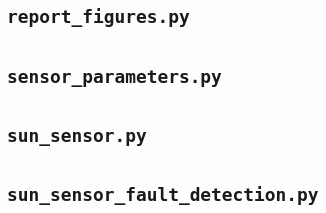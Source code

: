 \documentclass[11pt,a4paper]{article}
\begin{document}
\subsection{\texttt{report\_figures.py}}


\subsection{\texttt{sensor\_parameters.py}}


\subsection{\texttt{sun\_sensor.py}}


\subsection{\texttt{sun\_sensor\_fault\_detection.py}}

\end{document}
